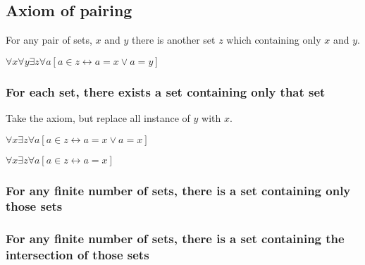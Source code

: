 
\subsection{Axiom of pairing}

For any pair of sets, \(x\) and \(y\) there is another set \(z\) which containing only \(x\) and \(y\).

$\forall x \forall y \exists z \forall a[a\in z \leftrightarrow a=x \lor a=y]$

\subsubsection{For each set, there exists a set containing only that set}

Take the axiom, but replace all instance of \(y\) with \(x\).

$\forall x \exists z \forall a[a\in z \leftrightarrow a=x \lor a=x]$

$\forall x \exists z \forall a[a\in z \leftrightarrow a=x]$

\subsubsection{For any finite number of sets, there is a set containing only those sets}

\subsubsection{For any finite number of sets, there is a set containing the intersection of those sets}

